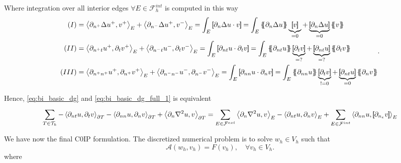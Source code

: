 Where integration over all interior edges $ \forall E \in \mathcal{F}_{h}^{int}$ is computed in this way
\begin{equation*}
    \begin{split}
        (I) &  =    \left<\partial _{n^{+}} \Delta u^{+} ,v^{+}\right>_{E} +
        \left<\partial _{n^{-}} \Delta u^{+} ,v^{-}\right>_{E} =   \int_{E}^{}
        \jump{ \partial _{n} \Delta u \cdot v } =
         \int_{E}^{}
         \mean{ \partial _{n} \Delta u } \underbrace{\jump{ v }}_{= 0}    + \underbrace{\jump{ \partial _{n} \Delta u
         }}_{= 0}    \mean{ v } \\
        (II) &  =     \left<\partial _{n^{+}t} u^{+}, \partial_{t} v^{+}
        \right>_{E} +  \left<\partial _{n^{-}t} u^{-}, \partial_{t} v^{-}
\right>_{E}    =   \int_{E}^{}
        \jump{ \partial _{nt} u \cdot  \partial_{t} v } =
         \int_{E}^{}
         \mean{ \partial _{nt} u    } \underbrace{\jump{ \partial_{t} v }  }_{= ?}    + \underbrace{\jump{ \partial
                 _{nt}  u
         }}_{= ?}    \mean{ \partial _{t}v } \\
        (III) &  =     \left<\partial _{n^{+}n^{+}} u^{+}, \partial_{n^{+}} v^{+} \right>_{E} +  \left<\partial _{n^{-}n^{-}} u^{-}, \partial_{n^{-}} v^{-} \right>_{E}    =    \int_{E}^{} \jump{ \partial _{nn} u \cdot  \partial_{n} v } = \int_{E}^{} \mean{ \partial _{nn} u    } \underbrace{\jump{ \partial_{t} v }  }_{!= 0}    + \underbrace{\jump{ \partial
                 _{nt}  u
         }}_{= 0}    \mean{ \partial _{n}v } \\
    \end{split}
.\end{equation*}


Hence, \eqref{eq:bi_basic_dg} and \eqref{eq:bi_basic_dg_full_1} is equivalent
\[
 \sum_{T \in  \mathcal{T}_{h} }^{}  - \left<\partial _{nt} u, \partial _{t}v
\right>_{\partial T} - \left<\partial _{nn} u, \partial _{n}v \right>_{\partial T} + \left<\partial _{n} \nabla ^2 u,v
\right>_{\partial T}
=  \sum_{E \in
\mathcal{F}^{ext}  }^{} \left<\partial _{n} \nabla  ^2 u, v  \right> _{E}
- \left<\partial _{nt} u, \partial _{n} v \right> _{E}
+ \sum_{E \in \mathcal{F}^{int} }^{} \left<\partial _{nn} u , \left[\!\!\left[  \partial _{n_{e}} v  \right]\!\!\right]
\right>_{E}
\]



 We have now the final C0IP formulation.
The discretized numerical problem is to solve $w_{h} \in V_{h}$ such that \[
\mathcal{A}\left( w_{h}, v_{h} \right)   = F\left( v_{h} \right), \quad \forall v_{h} \in V_{h}  .
\]
where

